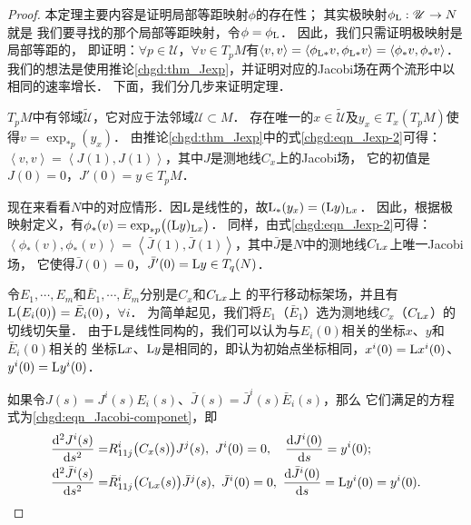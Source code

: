 \begin{proof}
    本定理主要内容是证明局部等距映射$\phi$的存在性；
    其实极映射$\phi_{\rm L} : \mathscr{U}\to N$就是
    我们要寻找的那个局部等距映射，令$\phi=\phi_{\rm L}$．    
    因此，我们只需证明极映射是局部等距的，
    即证明：$\forall p\in \mathscr{U}$，$\forall v\in T_p M$有$\left<v,v\right>=
    \left<\phi_{{\rm L}*}v,\phi_{{\rm L}*}v\right>=\left<\phi_{*}v,\phi_{*}v\right>$．
    我们的想法是使用推论\ref{chgd:thm_Jexp}，并证明对应的Jacobi场在两个流形中以相同的速率增长．
    下面，我们分几步来证明定理．
    
     $T_pM$中有邻域$\widetilde{\mathscr{U}}$，它对应于法邻域$\mathscr{U}\subset M$．
    存在唯一的$x\in \widetilde{\mathscr{U}}$及$y_x \in T_x (T_pM)$使得$v=\exp_{*p}(y_x)$．
    由推论\ref{chgd:thm_Jexp}中的式\eqref{chgd:eqn_Jexp-2}可得：
    $\left<v,v\right>=\left<J(1),J(1)\right>$，其中$J$是测地线$C_x$上的Jacobi场，
    它的初值是$J(0)=0$，$J'(0)=y \in T_pM$．
    
     现在来看看$N$中的对应情形．因${\rm L}$是线性的，故${\rm L}_* (y_x) = ({\rm L} y)_{{\rm L}x}$．
    因此，根据极映射定义，有$\phi_{*} (v) = \exp_{*p}\bigl(({\rm L}y)_{{\rm L}x}\bigr)$．
    同样，由式\eqref{chgd:eqn_Jexp-2}可得：$\left<\phi_{*} (v),\phi_{*} (v)\right>
    =\left<\bar{J}(1),\bar{J}(1)\right>$，其中$\bar{J}$是$N$中的测地线$C_{{\rm L}x}$上唯一Jacobi场，
    它使得$\bar{J}(0)=0$，$\bar{J}'(0)={\rm L}y \in T_q(N)$．
    
     令$E_1,\cdots,E_m$和$\bar{E}_1,\cdots,\bar{E}_m$分别是$C_x$和$C_{{\rm L}x}$上
    的平行移动标架场，并且有${\rm L}\bigl(E_i(0)\bigr)= \bar{E}_i(0)$，$\forall i$．
    为简单起见，我们将$E_1$（$\bar{E}_1$）选为测地线$C_x$（$C_{{\rm L}x}$）的切线切矢量．
    由于$\rm L$是线性同构的，我们可以认为与$E_i(0)$相关的坐标$x$、$y$和$\bar{E}_i(0)$相关的
    坐标${\rm L}x$、${\rm L}y$是相同的，即认为初始点坐标相同，$x^i(0) = {\rm L}x^i(0)$、$y^i(0) = {\rm L}y^i(0)$．
    
    如果令$J(s)= J^i(s) E_i(s)$、$\bar{J}(s)= \bar{J}^i(s) \bar{E}_i(s)$，那么
    它们满足的方程式为\eqref{chgd:eqn_Jacobi-componet}，即
    \begin{align}
        \frac{{\rm d}^2 J^i(s)}{{\rm d} s^2} =& R^i_{11j}\bigl(C_x(s)\bigr) J^j(s) , 
        \ J^i(0)=0,\quad \frac{{\rm d} J^i(0)}{{\rm d}s} = y^i(0) ; \label{chhss:eqn_tmpJ} \\
        \frac{{\rm d}^2 \bar{J}^i(s)}{{\rm d} s^2} =& \bar{R}^i_{11j}\bigl(C_{{\rm L}x}(s)\bigr) \bar{J}^j(s) , 
        \ \bar{J}^i(0)=0,\ \frac{{\rm d} \bar{J}^i(0)}{{\rm d}s} = {\rm L}y^i(0) = y^i(0) .
        \label{chhss:eqn_tmpJb}
    \end{align}
    

\end{proof}
